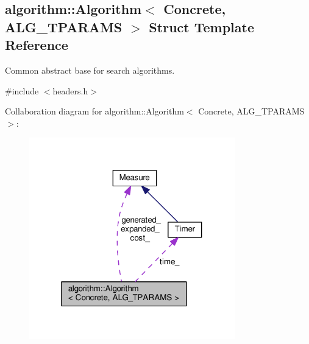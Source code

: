 \hypertarget{structalgorithm_1_1Algorithm}{}\subsection{algorithm\+:\+:Algorithm$<$ Concrete, A\+L\+G\+\_\+\+T\+P\+A\+R\+A\+MS $>$ Struct Template Reference}
\label{structalgorithm_1_1Algorithm}


Common abstract base for search algorithms.  




{\ttfamily \#include $<$headers.\+h$>$}



Collaboration diagram for algorithm\+:\+:Algorithm$<$ Concrete, A\+L\+G\+\_\+\+T\+P\+A\+R\+A\+MS $>$\+:\nopagebreak
\begin{figure}[H]
\begin{center}
\leavevmode
\includegraphics[width=253pt]{structalgorithm_1_1Algorithm__coll__graph}
\end{center}
\end{figure}
